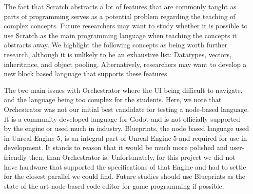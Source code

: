 The fact that Scratch abstracts a lot of features that are commonly taught as parts of programming serves as a potential problem regarding the teaching of complex concepts.
Future researchers may want to study whether it is possible to use Scratch as the main programming language when teaching the concepts it abstracts away.
We highlight the following concepts as being worth further research, although it is unlikely to be an exhaustive list: Datatypes, vectors, inheritance, and object pooling.
Alternatively, researchers may want to develop a new block based language that supports these features.

The two main issues with Orchestrator where the UI being difficult to navigate, and the language being too complex for the students.
Here, we note that Orchestrator was not our initial best candidate for testing a node-based language.
It is a community-developed language for Godot and is not officially supported by the engine or used much in industry.
Blueprints, the node based language used in Unreal Engine 5, is an integral part of Unreal Engine 5 and required for use in development.
It stands to reason that it would be much more polished and user-friendly then, than Orchestrator is.
Unfortunately, for this project we did not have hardware that supported the specifications of that Engine and had to settle for the closest parallel we could find.
Future studies should use Blueprints as the state of the art node-based code editor for game programming if possible.
